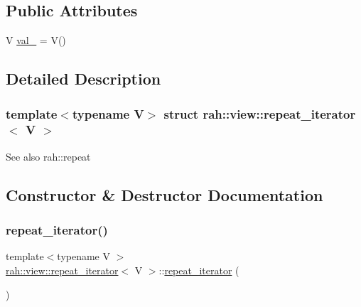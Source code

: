 \subsection*{Public Attributes}
\begin{DoxyCompactItemize}
\item 
V \mbox{\hyperlink{structrah_1_1view_1_1repeat__iterator_a6286ca38cb848630cb870dc6ab42eb79}{val\+\_\+}} = V()
\end{DoxyCompactItemize}


\subsection{Detailed Description}
\subsubsection*{template$<$typename V$>$\newline
struct rah\+::view\+::repeat\+\_\+iterator$<$ V $>$}

\begin{DoxySeeAlso}{See also}
rah\+::repeat 
\end{DoxySeeAlso}


\subsection{Constructor \& Destructor Documentation}
\mbox{\label{structrah_1_1view_1_1repeat__iterator_a627f63a3a1ecf8a5dbcc88fb47d4a494}} 
\subsubsection{\texorpdfstring{repeat\_iterator()}{repeat\_iterator()}\hspace{0.1cm}{\footnotesize\ttfamily [1/2]}}
{\footnotesize\ttfamily template$<$typename V $>$ \\
\mbox{\hyperlink{structrah_1_1view_1_1repeat__iterator}{rah\+::view\+::repeat\+\_\+iterator}}$<$ V $>$\+::\mbox{\hyperlink{structrah_1_1view_1_1repeat__iterator}{repeat\+\_\+iterator}} (\begin{DoxyParamCaption}{ }\end{DoxyParamCaption})\hspace{0.3cm}{\ttfamily [default]}}

